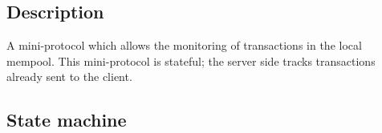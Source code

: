 \newcommand{\NextTx}{\state{NextTx}}
\newcommand{\MsgNextTx}{\msg{MsgNextTx}}
\newcommand{\MsgReplyNextTx}{\msg{MsgReplyNextTx}}

\newcommand{\MsgHasTx}{\msg{MsgHasTx}}
\newcommand{\HasTx}{\state{HasTx}}
\newcommand{\MsgReplyHasTx}{\msg{MsgReplyHasTx}}

\newcommand{\GetSizes}{\state{GetSizes}}
\newcommand{\MsgGetSizes}{\msg{MsgGetSizes}}
\newcommand{\MsgReplyGetSizes}{\msg{MsgReplyGetSizes}}

\newcommand{\GetMeasures}{\state{GetMeasures}}
\newcommand{\MsgGetMeasures}{\msg{MsgGetMeasures}}
\newcommand{\MsgReplyGetMeasures}{\msg{MsgReplyGetMeasures}}

\subsection{Description}

A mini-protocol which allows the monitoring of transactions in the local mempool. This
mini-protocol is stateful; the server side tracks transactions already sent to
the client.

\subsection{State machine}

